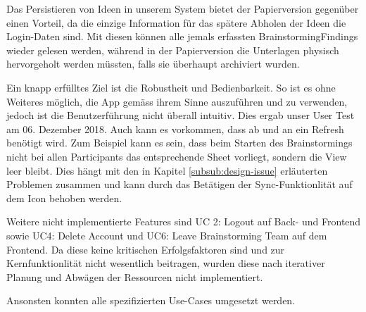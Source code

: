 Das Persistieren von Ideen in unserem System bietet der Papierversion gegenüber einen Vorteil, da die einzige Information für das spätere Abholen der Ideen die Login-Daten sind. Mit diesen können alle jemals erfassten BrainstormingFindings wieder gelesen werden, während in der Papierversion die Unterlagen physisch hervorgeholt werden müssten, falls sie überhaupt archiviert wurden.  

Ein knapp erfülltes Ziel ist die Robustheit und Bedienbarkeit. So ist es ohne Weiteres möglich, die App gemäss ihrem Sinne auszuführen und zu verwenden, jedoch ist die Benutzerführung nicht überall intuitiv. Dies ergab unser User Test am 06. Dezember 2018. Auch kann es vorkommen, dass ab und an ein Refresh benötigt wird. Zum Beispiel kann es sein, dass beim Starten des Brainstormings nicht bei allen Participants das entsprechende Sheet vorliegt, sondern die View leer bleibt. Dies hängt mit den in Kapitel \ref{subsub:design-issue} erläuterten Problemen zusammen und kann durch das Betätigen der Sync-Funktionlität auf dem Icon behoben werden. 

Weitere nicht implementierte Features sind UC 2: Logout auf Back- und Frontend sowie UC4: Delete Account und UC6: Leave Brainstorming Team auf dem Frontend. Da diese keine kritischen Erfolgsfaktoren sind und zur Kernfunktionlität nicht wesentlich beitragen, wurden diese nach iterativer Planung und Abwägen der Ressourcen nicht implementiert.

Ansonsten konnten alle spezifizierten Use-Cases umgesetzt werden.